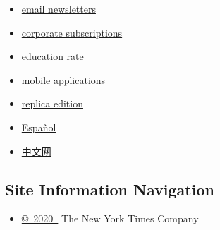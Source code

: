 \begin{itemize}
\tightlist
\item
  \href{https://web.archive.org/web/20200206210009/https://www.nytimes.com/newsletters}{email
  newsletters}
\item
  \href{https://web.archive.org/web/20200206210009/https://www.nytimes.com/corporateleftnav}{corporate
  subscriptions}
\item
  \href{https://web.archive.org/web/20200206210009/https://www.nytimes.com/educationleftnav}{education
  rate}
\end{itemize}

\begin{itemize}
\tightlist
\item
  \href{https://web.archive.org/web/20200206210009/http://www.nytimes.com/services/mobile/index.html}{mobile
  applications}
\item
  \href{https://web.archive.org/web/20200206210009/http://eedition.nytimes.com/cgi-bin/signup.cgi?cc=37FYY}{replica
  edition}
\item
  \href{https://web.archive.org/web/20200206210009/https://www.nytimes.com/es/}{Español}
\item
  \href{https://web.archive.org/web/20200206210009/https://cn.nytimes.com/}{中文网}
\end{itemize}

\hypertarget{site-information-navigation}{%
\subsection{Site Information
Navigation}\label{site-information-navigation}}

\begin{itemize}
\tightlist
\item
  \href{https://web.archive.org/web/20200206210009/https://help.nytimes.com/hc/en-us/articles/115014792127-Copyright-notice}{©~2020~}
  The New York Times Company
\end{itemize}

